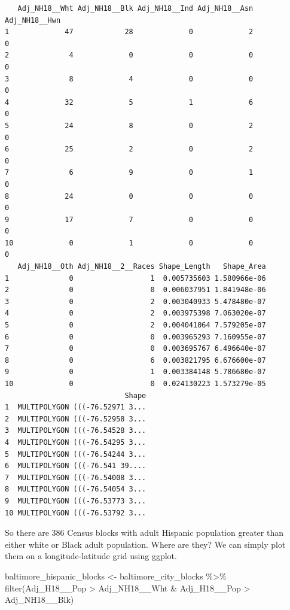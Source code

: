 \documentclass[
  letterpaper,
  DIV=11,
  numbers=noendperiod]{scrreprt}
\newenvironment{Shaded}{\begin{snugshade}}{\end{snugshade}}
\newcommand{\FunctionTok}[1]{\textcolor[rgb]{0.28,0.35,0.67}{#1}}
\newcommand{\NormalTok}[1]{\textcolor[rgb]{0.00,0.23,0.31}{#1}}
\newcommand{\OtherTok}[1]{\textcolor[rgb]{0.00,0.23,0.31}{#1}}
\newcommand{\SpecialCharTok}[1]{\textcolor[rgb]{0.37,0.37,0.37}{#1}}
\begin{document}
\begin{verbatim}
   Adj_NH18__Wht Adj_NH18__Blk Adj_NH18__Ind Adj_NH18__Asn Adj_NH18__Hwn
1             47            28             0             2             0
2              4             0             0             0             0
3              8             4             0             0             0
4             32             5             1             6             0
5             24             8             0             2             0
6             25             2             0             2             0
7              6             9             0             1             0
8             24             0             0             0             0
9             17             7             0             0             0
10             0             1             0             0             0
   Adj_NH18__Oth Adj_NH18__2__Races Shape_Length   Shape_Area
1              0                  1  0.005735603 1.580966e-06
2              0                  0  0.006037951 1.841948e-06
3              0                  2  0.003040933 5.478480e-07
4              0                  2  0.003975398 7.063020e-07
5              0                  2  0.004041064 7.579205e-07
6              0                  0  0.003965293 7.160955e-07
7              0                  0  0.003695767 6.496640e-07
8              0                  6  0.003821795 6.676600e-07
9              0                  1  0.003384148 5.786680e-07
10             0                  0  0.024130223 1.573279e-05
                            Shape
1  MULTIPOLYGON (((-76.52971 3...
2  MULTIPOLYGON (((-76.52958 3...
3  MULTIPOLYGON (((-76.54528 3...
4  MULTIPOLYGON (((-76.54295 3...
5  MULTIPOLYGON (((-76.54244 3...
6  MULTIPOLYGON (((-76.541 39....
7  MULTIPOLYGON (((-76.54008 3...
8  MULTIPOLYGON (((-76.54054 3...
9  MULTIPOLYGON (((-76.53773 3...
10 MULTIPOLYGON (((-76.53792 3...
\end{verbatim}

So there are 386 Census blocks with adult Hispanic population greater
than either white or Black adult population. Where are they? We can
simply plot them on a longitude-latitude grid using ggplot.

\begin{Shaded}
\begin{Highlighting}[]
\NormalTok{baltimore\_hispanic\_blocks }\OtherTok{\textless{}{-}}\NormalTok{ baltimore\_city\_blocks }\SpecialCharTok{\%\textgreater{}\%}
  \FunctionTok{filter}\NormalTok{(Adj\_H18\_\_Pop }\SpecialCharTok{\textgreater{}}\NormalTok{ Adj\_NH18\_\_Wht }\SpecialCharTok{\&}\NormalTok{ Adj\_H18\_\_Pop }\SpecialCharTok{\textgreater{}}\NormalTok{ Adj\_NH18\_\_Blk) }
\end{Highlighting}
\end{Shaded}
\end{document}
